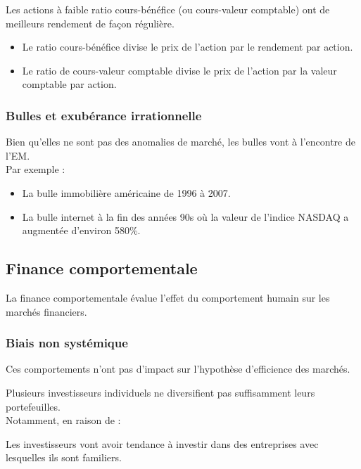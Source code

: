 \documentclass[10pt, french]{article}
\begin{document}
\begin{multicols*}{2}
\begin{definitionNOHFILLprop}
Les actions à faible ratio cours-bénéfice (ou cours-valeur comptable) ont de meilleurs rendement de façon régulière.

\begin{itemize}
	\item	Le ratio cours-bénéfice divise le prix de l'action par le rendement par action.
	\item	Le ratio de cours-valeur comptable divise le prix de l'action par la valeur comptable par action.
\end{itemize}
\end{definitionNOHFILLprop}

\subsubsection{Bulles et exubérance irrationnelle}
Bien qu'elles ne sont pas des anomalies de marché, les bulles vont à l'encontre de l'EM.\\

Par exemple : 
\begin{itemize}
	\item	La bulle immobilière américaine de 1996 à 2007.
	\item	La bulle internet à la fin des années 90s où la valeur de l'indice NASDAQ a augmentée d'environ 580\%.
\end{itemize}


\columnbreak
\subsection{Finance comportementale}
La finance comportementale évalue l'effet du comportement humain sur les marchés financiers.

\subsubsection{Biais non systémique}
Ces comportements n'ont pas d'impact sur l'hypothèse d'efficience des marchés.

\begin{definitionNOHFILLsub}
Plusieurs investisseurs individuels ne diversifient pas suffisamment leurs portefeuilles. \\

Notamment, en raison de : 
\begin{definitionNOHFILLprop}
Les investisseurs vont avoir tendance à investir dans des entreprises avec lesquelles ils sont familiers.
\end{definitionNOHFILLprop}


\end{definitionNOHFILLsub}
\end{multicols*}
\end{document}
